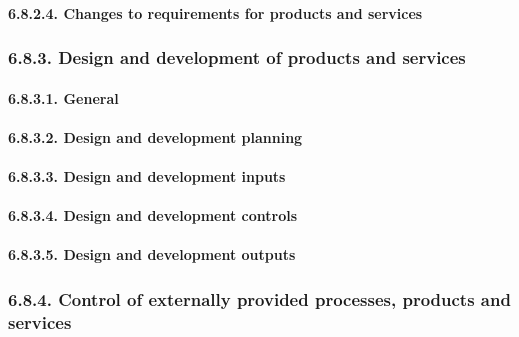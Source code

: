 \documentclass[
]{article}
\begin{document}
\hypertarget{changes-to-requirements-for-products-and-services}{%
\paragraph{6.8.2.4. Changes to requirements for products and
services}\label{changes-to-requirements-for-products-and-services}}

\hypertarget{design-and-development-of-products-and-services}{%
\subsubsection{6.8.3. Design and development of products and
services}\label{design-and-development-of-products-and-services}}

\hypertarget{general-4}{%
\paragraph{6.8.3.1. General}\label{general-4}}

\hypertarget{design-and-development-planning}{%
\paragraph{6.8.3.2. Design and development
planning}\label{design-and-development-planning}}

\hypertarget{design-and-development-inputs}{%
\paragraph{6.8.3.3. Design and development
inputs}\label{design-and-development-inputs}}

\hypertarget{design-and-development-controls}{%
\paragraph{6.8.3.4. Design and development
controls}\label{design-and-development-controls}}

\hypertarget{design-and-development-outputs}{%
\paragraph{6.8.3.5. Design and development
outputs}\label{design-and-development-outputs}}

\hypertarget{control-of-externally-provided-processes-products-and-services}{%
\subsubsection{6.8.4. Control of externally provided processes, products
and
services}\label{control-of-externally-provided-processes-products-and-services}}
\end{document}
